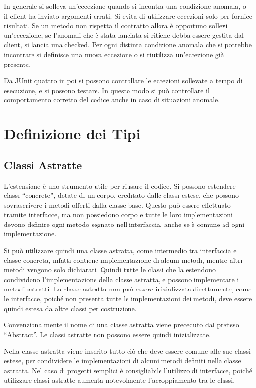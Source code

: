 \documentclass{article}
\numberwithin{equation}{subsection}
\begin{document}
In generale si solleva un'eccezione quando si incontra una condizione anomala, o il client ha inviato argomenti errati. Si evita di utilizzare eccezioni 
solo per fornice risultati. Se un metodo non rispetta il contratto allora è opportuno sollevi un'eccezione, se l'anomali che è stata lanciata si ritiene debba essere gestita dal client, si lancia una checked. 
Per ogni distinta condizione anomala che si potrebbe incontrare si definisce una nuova eccezione o si riutilizza un'eccezione già presente. 

Da JUnit quattro in poi si possono controllare le eccezioni sollevate a tempo di esecuzione, e si possono testare. In questo modo si può controllare il 
comportamento corretto del codice anche in caso di situazioni anomale.

\clearpage

\section{Definizione dei Tipi}

\subsection{Classi Astratte}

L'estensione è uno strumento utile per riusare il codice. Si possono estendere classi ``concrete'', dotate di un corpo, ereditato dalle 
classi estese, che possono sovrascrivere i metodi offerti dalla classe base. 
Questo può essere effettuato tramite interfacce, ma non possiedono corpo e tutte le loro implementazioni devono definire ogni metodo segnato nell'interfaccia, anche se è comune ad ogni 
implementazione. 

Si può utilizzare quindi una classe astratta, come intermedio tra interfaccia e classe concreta, infatti contiene implementazione di alcuni metodi, mentre altri metodi 
vengono solo dichiarati. Quindi tutte le classi che la estendono condividono l'implementazione della classe astratta, e possono implementare i metodi astratti. 
La classe astratta non può essere inizializzata direttamente, come le interfacce, poiché non presenta tutte le implementazioni dei metodi, deve essere quindi estesa da altre 
classi per costruzione. 


Convenzionalmente il nome di una classe astratta viene preceduto dal prefisso ``Abstract''. Le classi astratte non possono essere quindi inizializzate. 

Nella classe astratta viene inserito tutto ciò che deve essere comune alle sue classi estese, per condividere le implementazioni di alcuni metodi definiti nella classe 
astratta. Nel caso di progetti semplici è consigliabile l'utilizzo di interfacce, poiché utilizzare classi astratte aumenta notevolmente l'accoppiamento tra le classi. 
\end{document}
